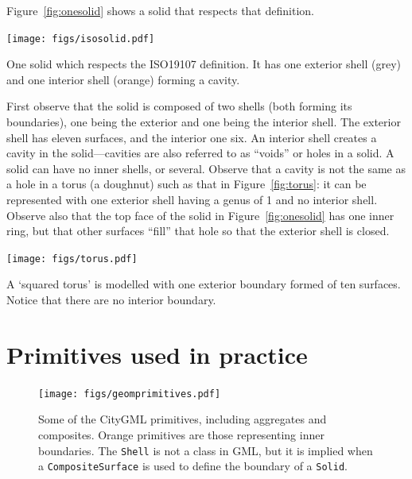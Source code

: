 %

Figure~\ref{fig:onesolid} shows a solid that respects that definition.
\begin{marginfigure}
  \centering
  \texttt{[image: figs/isosolid.pdf]}
  \caption[One solid which respects the ISO19107 definition]{One solid which respects the ISO19107 definition. It has one exterior shell (grey) and one interior shell (orange) forming a cavity.}%
\label{fig:onesolid}
\end{marginfigure}
First observe that the solid is composed of two shells (both forming its boundaries), one being the exterior and one being the interior shell.
The exterior shell has eleven surfaces, and the interior one six.
An interior shell creates a cavity in the solid---cavities are also referred to as ``voids'' or holes in a solid.
A solid can have no inner shells, or several.
Observe that a cavity is not the same as a hole in a torus (a doughnut) such as that in Figure~\ref{fig:torus}: it can be represented with one exterior shell having a genus of 1 and no interior shell.
Observe also that the top face of the solid in Figure~\ref{fig:onesolid} has one inner ring, but that other surfaces ``fill'' that hole so that the exterior shell is closed.
\begin{marginfigure}
  \centering
  \texttt{[image: figs/torus.pdf]}
  \caption[A `squared torus']{A `squared torus' is modelled with one exterior boundary formed of ten surfaces. Notice that there are no interior boundary.}%
\label{fig:torus}
\end{marginfigure}


%
\section{Primitives used in practice}

\begin{figure}
  \centering
  \texttt{[image: figs/geomprimitives.pdf]}
  \caption[Some of the CityGML primitives]{Some of the CityGML primitives, including aggregates and composites. Orange primitives are those representing inner boundaries. The \texttt{Shell} is not a class in GML, but it is implied when a \texttt{CompositeSurface} is used to define the boundary of a \texttt{Solid}.}%
\label{fig:geomprimitives}
\end{figure}

%

